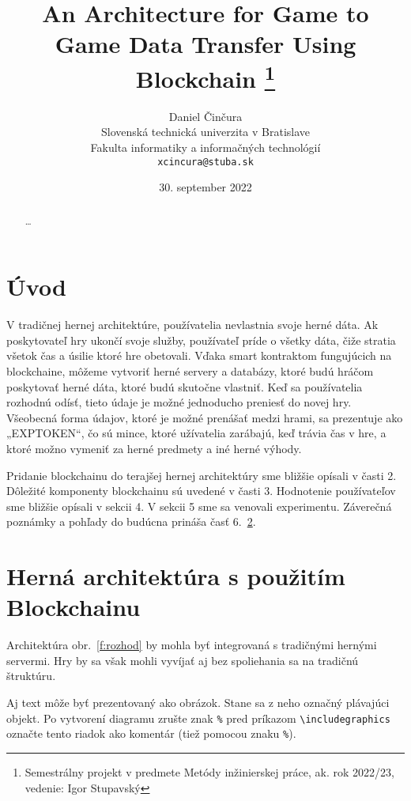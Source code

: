 \documentclass[10pt,twoside,slovak,a4paper]{article}
\title{An Architecture for Game to Game Data Transfer Using Blockchain
\thanks{Semestrálny projekt v predmete Metódy inžinierskej práce, ak. rok 2022/23, vedenie: Igor Stupavský}} %
\author{Daniel Činčura\\[2pt]
	{\small Slovenská technická univerzita v Bratislave}\\
	{\small Fakulta informatiky a informačných technológií}\\
	{\small \texttt{xcincura@stuba.sk}}
	}
\date{\small 30. september 2022} %
\begin{document}
\maketitle

\begin{abstract}
\ldots
\end{abstract}



\section{Úvod}

V tradičnej hernej architektúre, používatelia nevlastnia svoje herné dáta. Ak poskytovateľ hry ukončí svoje služby, používateľ príde o všetky dáta, čiže stratia všetok čas a úsilie ktoré hre obetovali. Vďaka smart kontraktom fungujúcich na blockchaine, môžeme vytvoriť herné servery a databázy, ktoré budú hráčom poskytovať herné dáta, ktoré budú skutočne vlastniť. Keď sa používatelia rozhodnú odísť, tieto údaje je možné jednoducho preniesť do novej hry. Všeobecná forma údajov, ktoré je možné prenášať medzi hrami, sa prezentuje ako „EXPTOKEN“, čo sú mince, ktoré užívatelia zarábajú, keď trávia čas v hre, a ktoré možno vymeniť za herné predmety a iné herné výhody.

Pridanie blockchainu do terajšej hernej architektúry sme bližšie opísali v časti 2. Dôležité komponenty blockchainu sú uvedené v časti 3. Hodnotenie používateľov sme bližšie opísali v sekcii 4. V sekcii 5 sme sa venovali experimentu. Záverečná poznámky a pohľady do budúcna prináša časť 6.~\ref{nejaka}.




\section{Herná architektúra s použitím Blockchainu} \label{nejaka}

Architektúra obr.~\ref{f:rozhod} by mohla byť integrovaná s tradičnými hernými servermi. Hry by sa však mohli vyvíjať aj bez spoliehania sa na tradičnú štruktúru.

\begin{figure*}[tbh]
\centering
Aj text môže byť prezentovaný ako obrázok. Stane sa z neho označný plávajúci objekt. Po vytvorení diagramu zrušte znak \texttt{\%} pred príkazom \verb|\includegraphics| označte tento riadok ako komentár (tiež pomocou znaku \texttt{\%}).
\caption{Rozhodujúci argument.}
\label{f:rozhod}
\end{figure*}
\end{document}
